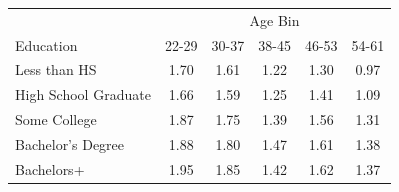 \begin{tabular}{lccccc}
\hline\hline
 & \multicolumn{5}{c}{Age Bin} \\
Education & 22-29 & 30-37 & 38-45 & 46-53 & 54-61 \\
\hline
Less than HS&1.70&1.61&1.22&1.30&0.97\\
High School Graduate&1.66&1.59&1.25&1.41&1.09\\
Some College&1.87&1.75&1.39&1.56&1.31\\
Bachelor's Degree&1.88&1.80&1.47&1.61&1.38\\
Bachelors+&1.95&1.85&1.42&1.62&1.37\\
\hline\hline
\end{tabular}
